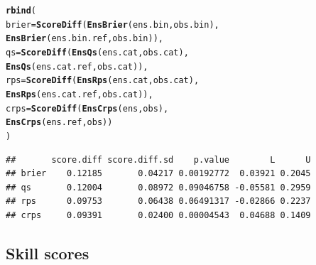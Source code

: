 \documentclass[article]{jss}\usepackage{graphicx, color}
\makeatletter
\newcommand{\hlfunctioncall}[1]{\textcolor[rgb]{0,0.501960784313725,0.752941176470588}{\textbf{#1}}}%
\newenvironment{kframe}{%
 \def\at@end@of@kframe{}%
 \ifinner\ifhmode%
  \def\at@end@of@kframe{\end{minipage}}%
  \begin{minipage}{\columnwidth}%
 \fi\fi%
 \def\FrameCommand##1{\hskip\@totalleftmargin \hskip-\fboxsep
 \colorbox{shadecolor}{##1}\hskip-\fboxsep
     \hskip-\linewidth \hskip-\@totalleftmargin \hskip\columnwidth}%
 \MakeFramed {\advance\hsize-\width
   \@totalleftmargin\z@ \linewidth\hsize
   \@setminipage}}%
 {\par\unskip\endMakeFramed%
 \at@end@of@kframe}
\newenvironment{knitrout}{}{} %
\makeatother
\begin{document}
\begin{knitrout}
\color{fgcolor}\begin{kframe}
\begin{alltt}
\hlfunctioncall{rbind}(
  brier = \hlfunctioncall{ScoreDiff}(\hlfunctioncall{EnsBrier}(ens.bin,     obs.bin), 
                    \hlfunctioncall{EnsBrier}(ens.bin.ref, obs.bin)),
  qs    = \hlfunctioncall{ScoreDiff}(\hlfunctioncall{EnsQs}(   ens.cat,     obs.cat),    
                    \hlfunctioncall{EnsQs}(   ens.cat.ref, obs.cat)),
  rps   = \hlfunctioncall{ScoreDiff}(\hlfunctioncall{EnsRps}(  ens.cat,     obs.cat),   
                    \hlfunctioncall{EnsRps}(  ens.cat.ref, obs.cat)),
  crps  = \hlfunctioncall{ScoreDiff}(\hlfunctioncall{EnsCrps}( ens,         obs),          
                    \hlfunctioncall{EnsCrps}( ens.ref,     obs))
)
\end{alltt}
\begin{verbatim}
##       score.diff score.diff.sd    p.value        L      U
## brier    0.12185       0.04217 0.00192772  0.03921 0.2045
## qs       0.12004       0.08972 0.09046758 -0.05581 0.2959
## rps      0.09753       0.06438 0.06491317 -0.02866 0.2237
## crps     0.09391       0.02400 0.00004543  0.04688 0.1409
\end{verbatim}
\end{kframe}
\end{knitrout}




\subsection{Skill scores}
\end{document}
